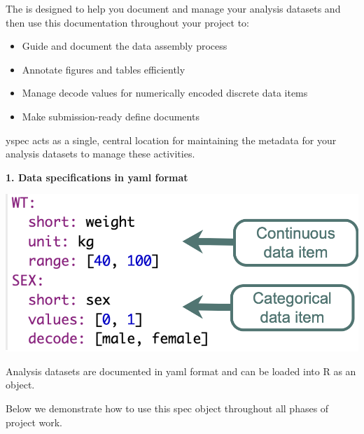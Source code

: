 \documentclass[portrait,fontscale=0.46,paperwidth=36in,paperheight=48in]{baposter}
\begin{document}
\begin{poster}
{\begin{minipage}[c]{0.333\linewidth}
\begin{demobx}[]
	The  is designed to help you document and manage your analysis datasets and then use this documentation throughout your project to:
	\begin{itemize}
		\vspace{-0.3cm}
		\item Guide and document the data assembly process
		\vspace{-0.2cm}
		\item Annotate figures and tables efficiently
		\vspace{-0.2cm}
		\item Manage decode values for numerically encoded discrete data items
		\vspace{-0.2cm}
		\item Make submission-ready define documents
	\end{itemize}
	\vspace{-0.2cm}

	yspec acts as a single, central location for maintaining the metadata for your analysis datasets to manage these activities.

	\vspace{1mm}
	\textbf{1. Data specifications in yaml format}

	\begin{minipage}[c]{0.55\linewidth}
		\includegraphics[scale=0.375]{"images/spec-example-2.png"} 
	\end{minipage} %
	\begin{minipage}[c]{0.45\linewidth}
		Analysis datasets are documented in yaml format and can be loaded into R as an object. 

	
	\end{minipage} %
	Below we demonstrate how to use this spec object throughout all phases of project work.


\end{demobx}
\end{minipage}}
\end{poster}
\end{document}
